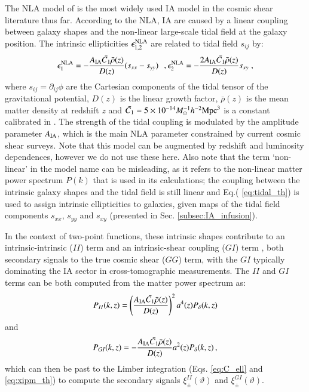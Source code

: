 \documentclass[useAMS,usenatbib]{mn2e}
\begin{document}
 
The NLA model of \citet{NLA} is the most widely used IA model in the cosmic shear literature thus far. According to the NLA, IA are caused by a linear coupling between galaxy shapes and the non-linear large-scale tidal field at the galaxy position. The intrinsic ellipticities $\epsilon_{1,2}^{\rm NLA}$ are related to tidal field $s_{ij}$ by:
 \begin{eqnarray}
\epsilon_1^{\rm NLA} = - \frac{A_{\rm IA}\bar{C_1}\bar{\rho}(z)}{D(z)} (s_{xx} - s_{yy}) \,\,\,\,,   \epsilon_2^{\rm NLA} = - \frac{2 A_{\rm IA}\bar{C_1}\bar{\rho}(z)}{D(z)} s_{xy}\;,
\label{eq:tidal_th}
\end{eqnarray}
where $s_{ij} = \partial_{ij}\phi$ are the Cartesian components of the tidal tensor of the gravitational potential,  $D(z)$ is the linear growth factor, $\bar{\rho}(z)$ is the mean matter density at redshift $z$ and $\bar{C_1}=5\times 10^{-14} M_{\odot}^{-1} h^{-2} {\rm Mpc}^3$ is a constant calibrated in \citet{Brown2002}. The strength of the tidal coupling is modulated by the amplitude parameter $A_{\rm IA}$, which is the main NLA parameter constrained by current cosmic shear surveys. Note that this model can be augmented by redshift and luminosity dependences, however we do not use these here. Also note that the term `non-linear' in the model name can be  misleading, as it refers to the non-linear matter power spectrum $P(k)$ that is used in its calculations; the coupling between the intrinsic galaxy shapes and the tidal field is still linear and   Eq.( \ref{eq:tidal_th}) is used to assign intrinsic ellipticities to galaxies, given maps of the tidal field components $s_{xx}$, $s_{yy}$ and $s_{xy}$ (presented in  Sec. \ref {subsec:IA_infusion}).





In the context of  two-point functions, these intrinsic shapes contribute to an intrinsic-intrinsic ($II$) term and an intrinsic-shear coupling ($GI$) term \citep{Hirata2004}, both secondary signals to the true cosmic shear ($GG$) term, with the $GI$ typically dominating the IA sector in cross-tomographic measurements.  The $II$ and $GI$ terms  can be both computed from the matter power spectrum as: 
 \begin{eqnarray}
P_{II}(k,z) =  \left(\frac{A_{\rm IA}\bar{C_1}\bar{\rho}(z)}{D(z)}\right)^2a^4(z) P_{\delta}(k,z)
\label{eq:Pk_II_th}
\end{eqnarray}
and
 \begin{eqnarray}
P_{GI}(k,z) = - \frac{A_{\rm IA}\bar{C_1}\bar{\rho}(z)}{D(z)}a^2(z) P_{\delta}(k,z) \, ,
\label{eq:Pk_GI_th}
\end{eqnarray}
which can then be past to the Limber integration (Eqs. \ref{eq:C_ell} and \ref{eq:xipm_th}) to compute  the secondary signals $\xi_{\pm}^{II}(\vartheta)$ and $\xi_{\pm}^{GI}(\vartheta)$. 
\end{document}
